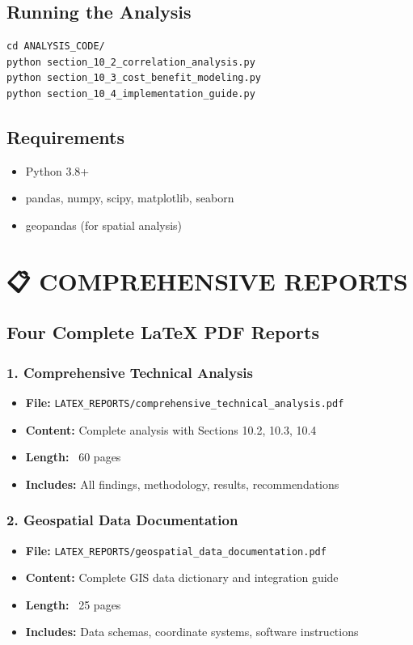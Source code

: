 \documentclass[11pt,letterpaper]{article}
\begin{document}
\subsection{Running the Analysis}
\begin{verbatim}
cd ANALYSIS_CODE/
python section_10_2_correlation_analysis.py
python section_10_3_cost_benefit_modeling.py
python section_10_4_implementation_guide.py
\end{verbatim}

\subsection{Requirements}
\begin{itemize}
    \item Python 3.8+
    \item pandas, numpy, scipy, matplotlib, seaborn
    \item geopandas (for spatial analysis)
\end{itemize}

\section{📋 COMPREHENSIVE REPORTS} \label{reports}

\subsection{Four Complete LaTeX PDF Reports}

\subsubsection{1. Comprehensive Technical Analysis}
\begin{itemize}
    \item \textbf{File:} \texttt{LATEX\_REPORTS/comprehensive\_technical\_analysis.pdf}
    \item \textbf{Content:} Complete analysis with Sections 10.2, 10.3, 10.4
    \item \textbf{Length:} ~60 pages
    \item \textbf{Includes:} All findings, methodology, results, recommendations
\end{itemize}

\subsubsection{2. Geospatial Data Documentation}
\begin{itemize}
    \item \textbf{File:} \texttt{LATEX\_REPORTS/geospatial\_data\_documentation.pdf}
    \item \textbf{Content:} Complete GIS data dictionary and integration guide
    \item \textbf{Length:} ~25 pages
    \item \textbf{Includes:} Data schemas, coordinate systems, software instructions
\end{itemize}
\end{document}
